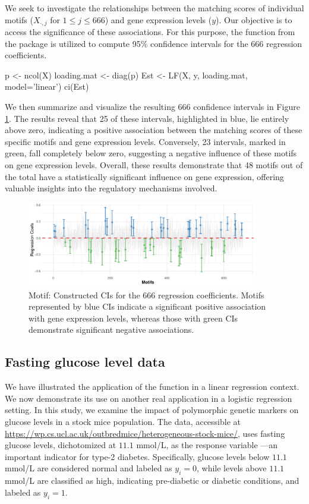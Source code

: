 \noindent 
We seek to investigate the relationships between the matching scores of individual motifs ($X_{\cdot,j}$ for $1 \leq j \leq 666$) and gene expression levels ($y$). Our objective is to access the significance of these associations. For this purpose, the  function from the package  is utilized to compute 95\% confidence intervals for the 666 regression coefficients.
\begin{example}
    p <- ncol(X)
    loading.mat <- diag(p)
    Est <- LF(X, y, loading.mat, model='linear')
    ci(Est)
\end{example}
We then summarize and visualize the resulting 666 confidence intervals in Figure \ref{fig: t134}.
The results reveal that 25 of these intervals, highlighted in {\color{NeonBlue} blue}, lie entirely above zero, indicating a positive association between the matching scores of these specific motifs and gene expression levels. Conversely, 23 intervals, marked in {\color{NeonGreen} green}, fall completely below zero, suggesting a negative influence of these motifs on gene expression levels. Overall, these results demonstrate that 48 motifs out of the total have a statistically significant influence on gene expression, offering valuable insights into the regulatory mechanisms involved.

\begin{figure}[!ht]
\centering
\includegraphics[width = 0.9\textwidth]{CI-Motif.pdf}
\caption{Motif: Constructed CIs for the 666 regression coefficients. Motifs represented by {\color{NeonBlue} blue} CIs indicate a significant positive association with gene expression levels, whereas those with {\color{NeonGreen} green} CIs demonstrate significant negative associations.} 
\label{fig: t134}
\end{figure}

\subsection{Fasting glucose level data}
We have illustrated the application of the  function in a linear regression context. We now demonstrate its use on another real application in a logistic regression setting. In this study, we examine the impact of polymorphic genetic markers on glucose levels in a stock mice population. The data, accessible at \url{https://wp.cs.ucl.ac.uk/outbredmice/heterogeneous-stock-mice/}, uses fasting glucose levels, dichotomized at $11.1$ mmol/L, as the response variable —an important indicator for type-2 diabetes. Specifically, glucose levels below $11.1$ mmol/L are considered normal and labeled as $y_i = 0$, while levels above $11.1$ mmol/L are classified as high, indicating pre-diabetic or diabetic conditions, and labeled as $y_i=1$.

